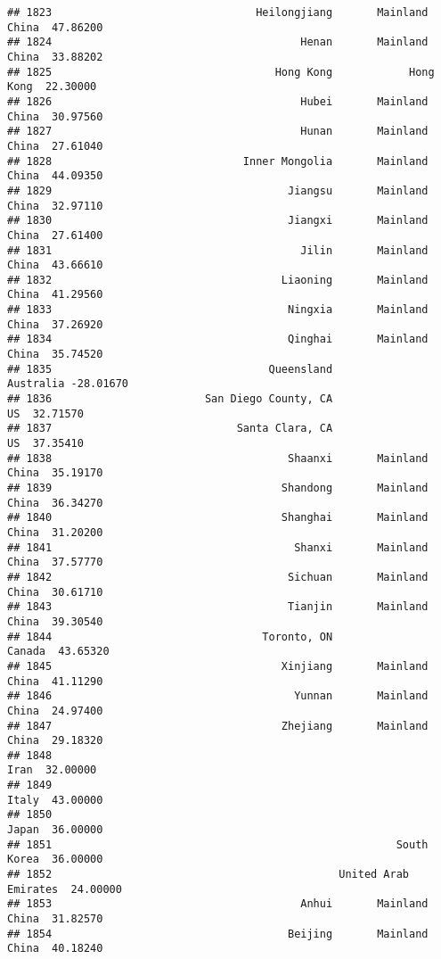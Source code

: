 \documentclass[
]{article}
\begin{document}
\begin{verbatim}
## 1823                                Heilongjiang       Mainland China  47.86200
## 1824                                       Henan       Mainland China  33.88202
## 1825                                   Hong Kong            Hong Kong  22.30000
## 1826                                       Hubei       Mainland China  30.97560
## 1827                                       Hunan       Mainland China  27.61040
## 1828                              Inner Mongolia       Mainland China  44.09350
## 1829                                     Jiangsu       Mainland China  32.97110
## 1830                                     Jiangxi       Mainland China  27.61400
## 1831                                       Jilin       Mainland China  43.66610
## 1832                                    Liaoning       Mainland China  41.29560
## 1833                                     Ningxia       Mainland China  37.26920
## 1834                                     Qinghai       Mainland China  35.74520
## 1835                                  Queensland            Australia -28.01670
## 1836                        San Diego County, CA                   US  32.71570
## 1837                             Santa Clara, CA                   US  37.35410
## 1838                                     Shaanxi       Mainland China  35.19170
## 1839                                    Shandong       Mainland China  36.34270
## 1840                                    Shanghai       Mainland China  31.20200
## 1841                                      Shanxi       Mainland China  37.57770
## 1842                                     Sichuan       Mainland China  30.61710
## 1843                                     Tianjin       Mainland China  39.30540
## 1844                                 Toronto, ON               Canada  43.65320
## 1845                                    Xinjiang       Mainland China  41.11290
## 1846                                      Yunnan       Mainland China  24.97400
## 1847                                    Zhejiang       Mainland China  29.18320
## 1848                                                             Iran  32.00000
## 1849                                                            Italy  43.00000
## 1850                                                            Japan  36.00000
## 1851                                                      South Korea  36.00000
## 1852                                             United Arab Emirates  24.00000
## 1853                                       Anhui       Mainland China  31.82570
## 1854                                     Beijing       Mainland China  40.18240

\end{verbatim}
\end{document}
